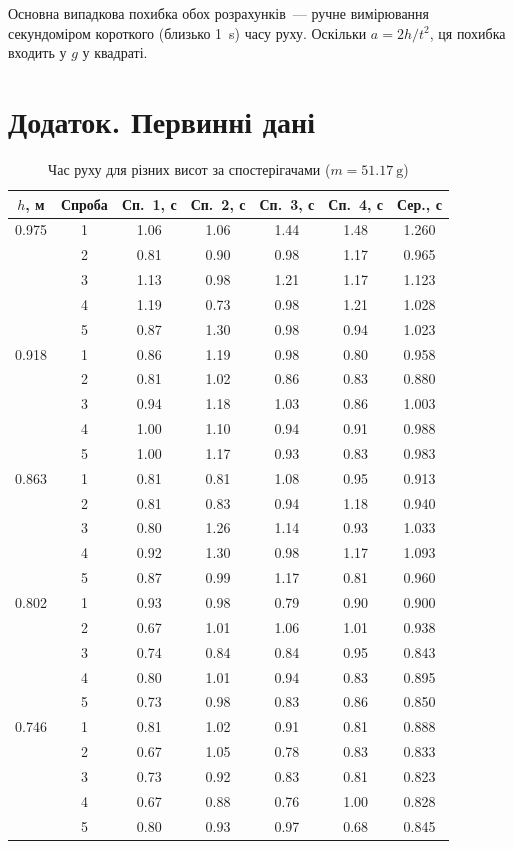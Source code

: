 \documentclass[ukrainian]{ucaphyslab}
\begin{document}
Основна випадкова похибка обох розрахунків~--- ручне вимірювання секундоміром короткого
(близько \SI{1}{\second}) часу руху. Оскільки $a = 2h/t^2$, ця похибка входить у $g$ у квадраті.
\section*{Додаток. Первинні дані}

\begin{table}[H]
  \centering
  \small
  \begin{tabular}{@{}cc cccc c@{}}
    \toprule
    $h$, м & Спроба & Сп.~1, с & Сп.~2, с & Сп.~3, с & Сп.~4, с & Сер., с \\
    \midrule
    0.975 & 1 & 1.06 & 1.06 & 1.44 & 1.48 & 1.260 \\
     & 2 & 0.81 & 0.90 & 0.98 & 1.17 & 0.965 \\
     & 3 & 1.13 & 0.98 & 1.21 & 1.17 & 1.123 \\
     & 4 & 1.19 & 0.73 & 0.98 & 1.21 & 1.028 \\
     & 5 & 0.87 & 1.30 & 0.98 & 0.94 & 1.023 \\
    \midrule
    0.918 & 1 & 0.86 & 1.19 & 0.98 & 0.80 & 0.958 \\
     & 2 & 0.81 & 1.02 & 0.86 & 0.83 & 0.880 \\
     & 3 & 0.94 & 1.18 & 1.03 & 0.86 & 1.003 \\
     & 4 & 1.00 & 1.10 & 0.94 & 0.91 & 0.988 \\
     & 5 & 1.00 & 1.17 & 0.93 & 0.83 & 0.983 \\
    \midrule
    0.863 & 1 & 0.81 & 0.81 & 1.08 & 0.95 & 0.913 \\
     & 2 & 0.81 & 0.83 & 0.94 & 1.18 & 0.940 \\
     & 3 & 0.80 & 1.26 & 1.14 & 0.93 & 1.033 \\
     & 4 & 0.92 & 1.30 & 0.98 & 1.17 & 1.093 \\
     & 5 & 0.87 & 0.99 & 1.17 & 0.81 & 0.960 \\
    \midrule
    0.802 & 1 & 0.93 & 0.98 & 0.79 & 0.90 & 0.900 \\
     & 2 & 0.67 & 1.01 & 1.06 & 1.01 & 0.938 \\
     & 3 & 0.74 & 0.84 & 0.84 & 0.95 & 0.843 \\
     & 4 & 0.80 & 1.01 & 0.94 & 0.83 & 0.895 \\
     & 5 & 0.73 & 0.98 & 0.83 & 0.86 & 0.850 \\
    \midrule
    0.746 & 1 & 0.81 & 1.02 & 0.91 & 0.81 & 0.888 \\
     & 2 & 0.67 & 1.05 & 0.78 & 0.83 & 0.833 \\
     & 3 & 0.73 & 0.92 & 0.83 & 0.81 & 0.823 \\
     & 4 & 0.67 & 0.88 & 0.76 & 1.00 & 0.828 \\
     & 5 & 0.80 & 0.93 & 0.97 & 0.68 & 0.845 \\
    \bottomrule
  \end{tabular}
  \caption{Час руху для різних висот за спостерігачами ($m = \SI{51.17}{\gram}$)}
\end{table}
\end{document}
